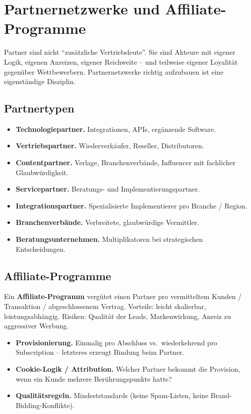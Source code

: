 \documentclass[11pt,a4paper,oneside]{article}
\newcommand{\fachbegriff}[1]{\textbf{#1}}
\begin{document}
\section{Partnernetzwerke und Affiliate-Programme}

Partner sind nicht ``zusätzliche Vertriebsleute''. Sie sind Akteure mit eigener Logik, eigenen Anreizen, eigener Reichweite -- und teilweise eigener Loyalität gegenüber Wettbewerbern. Partnernetzwerke richtig aufzubauen ist eine eigenständige Disziplin.

\subsection{Partnertypen}

\begin{itemize}
  \item \fachbegriff{Technologiepartner.} Integrationen, APIs, ergänzende Software.
  \item \fachbegriff{Vertriebspartner.} Wiederverkäufer, Reseller, Distributoren.
  \item \fachbegriff{Contentpartner.} Verlage, Branchenverbände, Influencer mit fachlicher Glaubwürdigkeit.
  \item \fachbegriff{Servicepartner.} Beratungs- und Implementierungspartner.
  \item \fachbegriff{Integrationspartner.} Spezialisierte Implementierer pro Branche / Region.
  \item \fachbegriff{Branchenverbände.} Verbreitete, glaubwürdige Vermittler.
  \item \fachbegriff{Beratungsunternehmen.} Multiplikatoren bei strategischen Entscheidungen.
\end{itemize}

\subsection{Affiliate-Programme}

Ein \fachbegriff{Affiliate-Programm} vergütet einen Partner pro vermitteltem Kunden / Transaktion / abgeschlossenem Vertrag. Vorteile: leicht skalierbar, leistungsabhängig. Risiken: Qualität der Leads, Markenwirkung, Anreiz zu aggressiver Werbung.

\begin{itemize}
  \item \textbf{Provisionierung.} Einmalig pro Abschluss vs.\ wiederkehrend pro Subscription -- letzteres erzeugt Bindung beim Partner.
  \item \textbf{Cookie-Logik / Attribution.} Welcher Partner bekommt die Provision, wenn ein Kunde mehrere Berührungspunkte hatte?
  \item \textbf{Qualitätsregeln.} Mindeststandards (keine Spam-Listen, keine Brand-Bidding-Konflikte).
\end{itemize}
\end{document}
